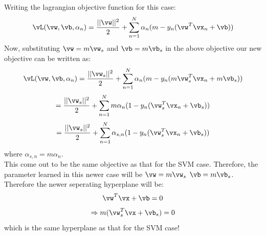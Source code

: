 \documentclass[a4paper,11pt]{article}
\begin{document}
\begin{mlsolution}

\noindent Writing the lagrangian objective function for this case:
\begin{equation}
  \vL(\vw, \vb, \alpha_{n}) = \frac{||\vw||^{2}}{2} + \sum_{n=1}^{N}\alpha_{n}(m - y_{n}(\vw^{T}\vx_{n}+\vb))
\end{equation}
Now, substituting $\vw = m\vw_{s}$ and $\vb = m\vb_{s}$ in the above objective our new objective can be written as:
\begin{equation}
  \vL(\vw, \vb, \alpha_{n}) = \frac{||\vw_{s}||^{2}}{2} + \sum_{n=1}^{N}\alpha_{n}(m - y_{n}(m\vw^{T}_{s}\vx_{n}+m\vb_{s}))
\end{equation}
\begin{equation}
  = \frac{||\vw_{s}||^{2}}{2} + \sum_{n=1}^{N}m\alpha_{n}(1 - y_{n}(\vw^{T}_{s}\vx_{n}+\vb_{s}))
\end{equation}
\begin{equation}
  = \frac{||\vw_{s}||^{2}}{2} + \sum_{n=1}^{N}\alpha_{s,n}(1 - y_{n}(\vw^{T}_{s}\vx_{n}+\vb_{s}))
\end{equation}
where $\alpha_{s,n}=m\alpha_{n}$.
\\This come out to be the same objective as that for the SVM case. Therefore, the parameter learned in this newer case will be $\vw = m\vw_{s}$ $\vb = m\vb_{s}$. Therefore the newer seperating hyperplane will be:
\begin{equation}
  \vw^{T}\vx + \vb = 0
\end{equation}
\begin{equation}
  \Rightarrow m(\vw^{T}_{s}\vx + \vb_{s}) = 0
\end{equation}
which is the same hyperplane as that for the SVM case!

\end{mlsolution}
\end{document}
